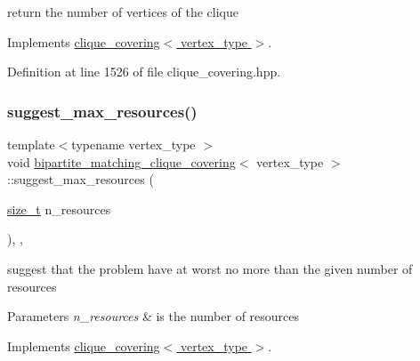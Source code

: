 return the number of vertices of the clique 



Implements \hyperlink{classclique__covering_ad387948a7851179bb056e68c72097008}{clique\+\_\+covering$<$ vertex\+\_\+type $>$}.



Definition at line 1526 of file clique\+\_\+covering.\+hpp.

\mbox{\label{classbipartite__matching__clique__covering_a80332109220a9bb4d8a599a5eed97c90}} 
\subsubsection{\texorpdfstring{suggest\+\_\+max\+\_\+resources()}{suggest\_max\_resources()}}
{\footnotesize\ttfamily template$<$typename vertex\+\_\+type $>$ \\
void \hyperlink{classbipartite__matching__clique__covering}{bipartite\+\_\+matching\+\_\+clique\+\_\+covering}$<$ vertex\+\_\+type $>$\+::suggest\+\_\+max\+\_\+resources (\begin{DoxyParamCaption}\item[{\hyperlink{tutorial__fpt__2017_2intro_2sixth_2test_8c_a7c94ea6f8948649f8d181ae55911eeaf}{size\+\_\+t}}]{n\+\_\+resources }\end{DoxyParamCaption})\hspace{0.3cm}{\ttfamily [inline]}, {\ttfamily [override]}, {\ttfamily [virtual]}}



suggest that the problem have at worst no more than the given number of resources 


\begin{DoxyParams}{Parameters}
{\em n\+\_\+resources} & is the number of resources \\
\hline
\end{DoxyParams}


Implements \hyperlink{classclique__covering_a77494360834560870073884abd37883b}{clique\+\_\+covering$<$ vertex\+\_\+type $>$}.



